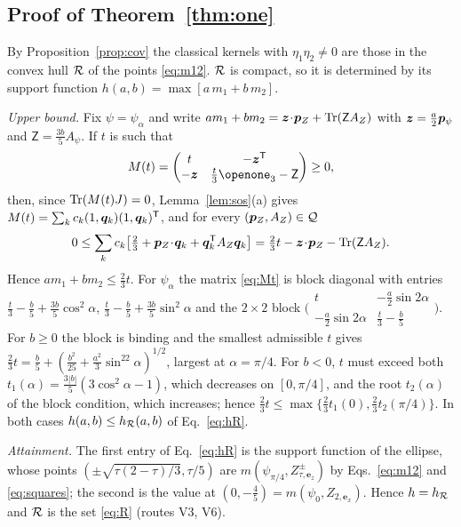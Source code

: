 \subsection{Proof of Theorem~\ref{thm:one}}

By Proposition~\ref{prop:cov} the classical kernels with $\eta_1\eta_2\ne0$ are those in the convex hull $\mathcal{R}$ of the points \eqref{eq:m12}. $\mathcal{R}$ is compact, so it is determined by its support function $h(a,b)=\max[a\,m_1+b\,m_2]$.

\emph{Upper bound.} Fix $\psi=\psi_\alpha$ and write $am_1+bm_2=\bm{z}\!\cdot\!\bm{p}_Z+\operatorname{Tr}(\mathsf{Z}A_Z)$ with $\bm{z}=\tfrac a2\bm{p}_\psi$ and $\mathsf{Z}=\tfrac{3b}{5}A_\psi$. If $t$ is such that
\begin{equation}
M(t)=\begin{pmatrix}t&-\bz^{\T}\\-\bz&\tfrac t3\openone_3-\mathsf{Z}\end{pmatrix}\ge0 ,
\label{eq:Mt}
\end{equation}
then, since $\operatorname{Tr}(M(t)J)=0$, Lemma~\ref{lem:sos}(a) gives $M(t)=\sum_kc_k(1,\bm{q}_k)(1,\bm{q}_k)^{\mathsf{T}}$, and for every $(\bm{p}_Z,A_Z)\in\mathcal{Q}$
\begin{equation}
0\le\sum_kc_k\big[\tfrac23+\bm{p}_Z\!\cdot\!\bm{q}_k+\bm{q}_k^{\mathsf{T}}A_Z\bm{q}_k\big]=\tfrac23t-\bm{z}\!\cdot\!\bm{p}_Z-\operatorname{Tr}(\mathsf{Z}A_Z).
\end{equation}
Hence $am_1+bm_2\le\tfrac23t$. For $\psi_\alpha$ the matrix \eqref{eq:Mt} is block diagonal with entries $\tfrac t3-\tfrac b5+\tfrac{3b}{5}\cos^2\!\alpha$, $\tfrac t3-\tfrac b5+\tfrac{3b}{5}\sin^2\!\alpha$ and the $2\times2$ block $\big(\begin{smallmatrix}t&-\frac a2\sin2\alpha\\-\frac a2\sin2\alpha&\frac t3-\frac b5\end{smallmatrix}\big)$. For $b\ge0$ the block is binding and the smallest admissible $t$ gives $\tfrac23t=\tfrac b5+(\tfrac{b^2}{25}+\tfrac{a^2}{3}\sin^22\alpha)^{1/2}$, largest at $\alpha=\pi/4$. For $b<0$, $t$ must exceed both $t_1(\alpha)=\tfrac{3|b|}{5}(3\cos^2\!\alpha-1)$, which decreases on $[0,\pi/4]$, and the root $t_2(\alpha)$ of the block condition, which increases; hence $\tfrac23t\le\max\{\tfrac23t_1(0),\tfrac23t_2(\pi/4)\}$. In both cases $h(a,b)\le h_{\mathcal{R}}(a,b)$ of Eq.~\eqref{eq:hR}.

\emph{Attainment.} The first entry of Eq.~\eqref{eq:hR} is the support function of the ellipse, whose points $(\pm\sqrt{\tau(2-\tau)/3},\tau/5)$ are $m(\psi_{\pi/4},Z^{\pm}_{\tau,\bm{e}_z})$ by Eqs.~\eqref{eq:m12} and \eqref{eq:squares}; the second is the value at $(0,-\tfrac45)=m(\psi_0,Z_{2,\bm{e}_x})$. Hence $h=h_{\mathcal{R}}$ and $\mathcal{R}$ is the set \eqref{eq:R} (routes V3, V6).

